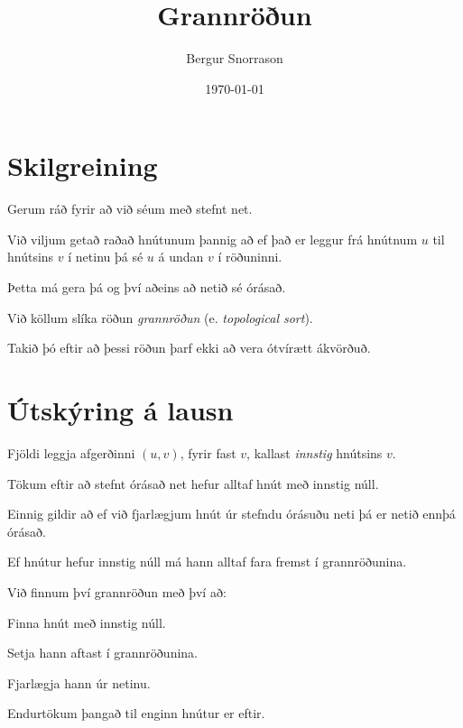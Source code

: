 \title{Grannröðun}
\author{Bergur Snorrason}
\date{\today}



\frame{\titlepage}

\section{Skilgreining}
{
    {
        \item<1-> Gerum ráð fyrir að við séum með stefnt net.
        \item<2-> Við viljum getað raðað hnútunum þannig að ef það er leggur frá hnútnum $u$ til hnútsins $v$ í netinu þá sé $u$ á undan $v$ í röðuninni.
        \item<3-> Þetta má gera þá og því aðeins að netið sé órásað.
        \item<4-> Við köllum slíka röðun \emph{grannröðun} (e. \emph{topological sort}).
        \item<5-> Takið þó eftir að þessi röðun þarf ekki að vera ótvírætt ákvörðuð.
    }
}

\section{Útskýring á lausn}
{
    {
        \item<1-> Fjöldi leggja afgerðinni $(u, v)$, fyrir fast $v$, kallast \emph{innstig} hnútsins $v$.
        \item<2-> Tökum eftir að stefnt órásað net hefur alltaf hnút með innstig núll.
        \item<3-> Einnig gildir að ef við fjarlægjum hnút úr stefndu órásuðu neti þá er netið ennþá órásað.
        \item<4-> Ef hnútur hefur innstig núll má hann alltaf fara fremst í grannröðunina.
        \item<5-> Við finnum því grannröðun með því að:
        {
            \item<6-> Finna hnút með innstig núll.
            \item<7-> Setja hann aftast í grannröðunina.
            \item<8-> Fjarlægja hann úr netinu.
            \item<9-> Endurtökum þangað til enginn hnútur er eftir.
        }
    }
}

